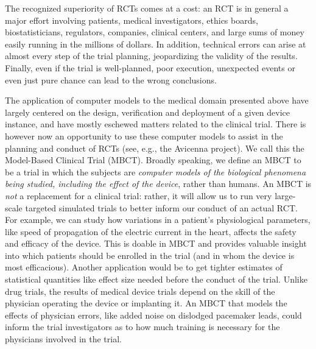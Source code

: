 The recognized superiority of RCTs comes at a cost: an RCT is in general a major effort involving patients, medical investigators, ethics boards, biostatisticians, regulators, companies, clinical centers, and large sums of money easily running in the millions of dollars. 
In addition, technical errors can arise at almost every step of the trial planning, jeopardizing the validity of the results. 
Finally, even if the trial is well-planned, poor execution, unexpected events or even just pure chance can lead to the wrong conclusions.

The application of computer models to the medical domain presented above have largely centered on the design, verification and deployment of a given device instance, and have mostly eschewed matters related to the clinical trial.
There is however now an opportunity to use these computer models to assist in the planning and conduct of RCTs (see, e.g., the Avicenna project\cite{Avicenna}). 
We call this the Model-Based Clinical Trial (MBCT). 
Broadly speaking, we define an MBCT to be a trial in which the subjects are \emph{computer models of the biological phenomena being studied, including the effect of the device}, rather than humans. 
An MBCT is \emph{not} a replacement for a clinical trial: rather, it will allow us to run very large-scale targeted simulated trials to better inform our conduct of an actual RCT. 
For example, we can study how variations in a patient's physiological parameters, like speed of propagation of the electric current in the heart, affects the safety and efficacy of the device. 
This is doable in MBCT and provides valuable insight into which patients should be enrolled in the trial (and in whom the device is most efficacious).
Another application would be to get tighter estimates of statistical quantities like effect size needed before the conduct of the trial.
Unlike drug trials, the results of medical device trials depend on the skill of the physician operating the device or implanting it. 
An MBCT that models the effects of physician errors, like added noise on dislodged pacemaker leads, could inform the trial investigators as to how much training is necessary for the physicians involved in the trial.

